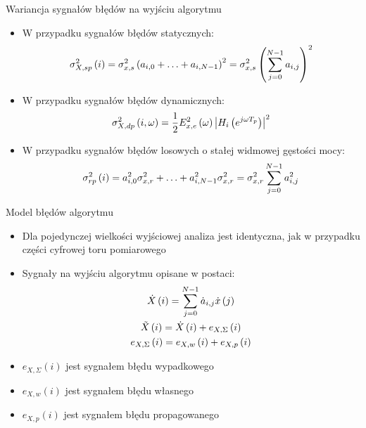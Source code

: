 \documentclass[12pt, polish, aspectratio = 169]{beamer}
\begin{document}
\begin{frame}{Wariancja sygnałów błędów na wyjściu algorytmu}
\begin{itemize}
\item W przypadku sygnałów błędów statycznych:
\begin{equation}
\sigma_{X,sp}^{2} \left(i\right) = \sigma_{x,s}^{2} \left( a_{i, 0} + \hdots + a_{i, N-1} \right)^{2} = \sigma_{x,s}^{2} \left( \sum _{j = 0} ^{N-1} a_{i, j} \right)^{2} \label{eq:alg_outvar_stat}
\end{equation}
\item W przypadku sygnałów błędów dynamicznych:
\begin{equation}
\sigma_{X,dp}^{2} \left(i, \omega\right) = \frac{1}{2} E_{x,e}^{2} \left(\omega\right) \left| H_{i} \left(e^{j\omega T_{p}}\right) \right|^{2} \label{eq:alg_outvar_dyn}
\end{equation}
\item W przypadku sygnałów błędów losowych o stałej widmowej gęstości mocy:
\begin{equation}
\sigma_{rp}^{2} \left(i\right) = a_{i, 0}^{2} \sigma_{x,r}^{2} + \hdots + a_{i, N-1}^{2} \sigma_{x,r}^{2} = \sigma_{x,r}^{2} \sum _{j=0} ^{N-1} {a_{i, j}^{2}} \label{eq:alg_outvar_rand}
\end{equation}
\end{itemize}
\end{frame}

\begin{frame}{Model błędów algorytmu}
\begin{itemize}
\item Dla pojedynczej wielkości wyjściowej analiza jest identyczna, jak w przypadku części cyfrowej toru pomiarowego
\item Sygnały na wyjściu algorytmu opisane w postaci:
\begin{gather}
\dot{X} \left(i\right) = \sum _{j = 0} ^{N-1} \dot{a}_{i,j} \dot{x} \left(j\right) \label{eq:alg_out_ideal} \\
\tilde{X} \left(i\right) = \dot{X} \left(i\right) + e_{X,\Sigma} \left(i\right) \label{eq:alg_out_real} \\
e_{X,\Sigma} \left(i\right) = e_{X,w} \left(i\right) + e_{X,p} \left(i\right) \label{eq:alg_out_err}
\end{gather}
\item $e_{X,\Sigma}(i)$ jest sygnałem błędu wypadkowego
\item $e_{X,w}(i)$ jest sygnałem błędu własnego
\item $e_{X,p}(i)$ jest sygnałem błędu propagowanego
\end{itemize}
\end{frame}
\end{document}
